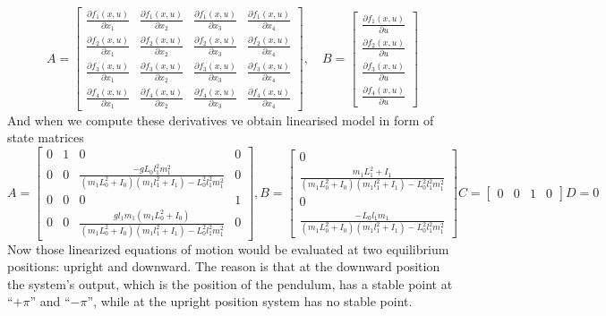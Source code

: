 \begin{equation}
A = \begin{bmatrix}
\frac{\partial f_1(x,u)}{\partial x_1}&\frac{\partial f_1(x,u)}{\partial x_2}&\frac{\partial f_1(x,u)}{\partial x_3}&\frac{\partial f_1(x,u)}{\partial x_4}\\
\frac{\partial f_2(x,u)}{\partial x_1}&\frac{\partial f_2(x,u)}{\partial x_2}&\frac{\partial f_2(x,u)}{\partial x_3}&\frac{\partial f_2(x,u)}{\partial x_4}\\
\frac{\partial f_3(x,u)}{\partial x_1}&\frac{\partial f_3(x,u)}{\partial x_2}&\frac{\partial f_3(x,u)}{\partial x_3}&\frac{\partial f_3(x,u)}{\partial x_4}\\
\frac{\partial f_4(x,u)}{\partial x_1}&\frac{\partial f_4(x,u)}{\partial x_2}&\frac{\partial f_4(x,u)}{\partial x_3}&\frac{\partial f_4(x,u)}{\partial x_4}
\end{bmatrix}, \quad B = \begin{bmatrix}
\frac{\partial f_1(x,u)}{\partial u}\\\frac{\partial f_2(x,u)}{\partial u}\\\frac{\partial f_3(x,u)}{\partial u}\\\frac{\partial f_4(x,u)}{\partial u}
\end{bmatrix}
\end{equation}
And when we compute these derivatives ve obtain linearised model in form of state matrices
\begin{subequations}
	\begin{equation}
		A =\begin{bmatrix}0&1&0&0\\
				0&0&\frac{-gL_0l_1^2m_1^2}{(m_1L_0^2+I_0)(m_1l_1^2+I_1)-L_0^2l_1^2m_1^2}&0\\
				0&0&0&1\\
				0&0&\frac{gl_1m_1(m_1L_0^2+I_0)}{(m_1L_0^2+I_0)(m_1l_1^2+I_1)-L_0^2l_1^2m_1^2}&0
			\end{bmatrix}, 
	\end{equation}
	\begin{equation}
		B=	\begin{bmatrix}
				0\\ 
				\frac{m_1L_1^2+I_1}{(m_1L_0^2+I_0)(m_1l_1^2+I_1)-L_0^2l_1^2m_1^2}\\
				0\\
				\frac{-L_0l_1m_1}{(m_1L_0^2+I_0)(m_1l_1^2+I_1)-L_0^2l_1^2m_1^2}
	\end{bmatrix}
\end{equation}

\begin{equation}C = \begin{bmatrix}0&0&1&0\end{bmatrix}\end{equation}
\begin{equation}D = 0\end{equation}
\end{subequations}
Now those linearized equations of motion would be evaluated at two equilibrium positions: upright and downward. The reason is that at the downward position the system's output, which is the position of the pendulum, has a stable point at “$+\pi$” and “$-\pi$”, while at the upright position system has no stable point.
 
